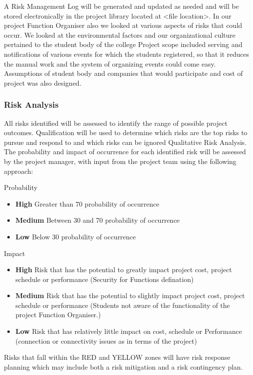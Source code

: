 A Risk Management Log will be generated and updated as needed and will be stored
electronically in the project library located at <file location>.
In our project Function Organiser also we looked at various aspects of risks that could occur.
We looked at the environmental factors and our organizational culture pertained to the student body of the college Project scope included serving and notifications of various events for which the students registered, so that it reduces the manual work and the system of organizing events could come easy. Assumptions of student body and companies that would participate and cost of project was also designed.
\subsubsection*{Risk Analysis}
All risks identified will be assessed to identify the range of possible project outcomes. Qualification will be used to determine which risks are the top risks to pursue and respond to and which risks can be ignored Qualitative Risk Analysis.
The probability and impact of occurrence for each identified risk will be assessed by the project manager, with input from the project team using the following approach:
\begin{description}
\item{Probability}
\begin{itemize}
\item \textbf{High} Greater than 70 probability of occurrence
\item\textbf{ Medium} Between 30 and 70 probability of occurrence
\item \textbf{Low} Below 30 probability of occurrence
\end{itemize}

\item{Impact}

\begin{itemize}

\item \textbf{High} Risk that has the potential to greatly impact project cost, project schedule or performance (Security for Functions defination)
\item\textbf{ Medium } Risk that has the potential to slightly impact project cost, project schedule or performance (Students not aware of the functionality of the project Function Organiser.)
\item \textbf{Low} Risk that has relatively little impact on cost, schedule or Performance (connection or connectivity issues as in terms of the project)

 \end{itemize}
 
 \end{description}
Risks that fall within the RED and YELLOW zones will have risk response planning which
may include both a risk mitigation and a risk contingency plan.
